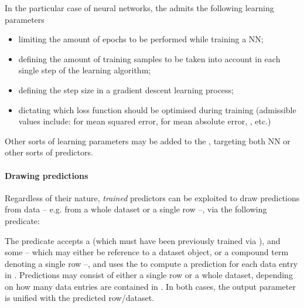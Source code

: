 \documentclass[12pt,a4paper,openright,twoside]{book}
\begin{document}
In the particular case of neural networks, the \mllib{} admits the following learning parameters
%
\begin{itemize}
    \item {} limiting the amount of epochs\footnotemark{} to be performed while training a NN;

    \item {} defining the amount of training samples to be taken into account in each single step of the learning algorithm;

    \item {} defining the step size in a gradient descent learning process;

    \item {} dictating which loss function should be optimised during training (admissible values include:  for mean squared error,  for mean absolute error, , etc.)
\end{itemize}
%
Other sorts of learning parameters may be added to the \mllib{}, targeting both NN or other sorts of predictors.

\paragraph{Drawing predictions}

Regardless of their nature, \emph{trained} predictors can be exploited to draw predictions from data -- e.g. from a whole dataset or a single row --, via the following predicate:
%
\begin{center}
\end{center}
%
The predicate accepts a  (which must have been previously trained via ), and some  -- which may either be reference to a dataset object, or a compound term denoting a single row --, and uses the  to compute a prediction for each data entry in .
%
Predictions may consist of either a single row or a whole dataset, depending on how many data entries are contained in .
%
In both cases, the  output parameter is unified with the predicted row/dataset.
\end{document}
